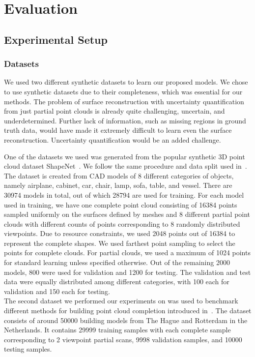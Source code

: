 \chapter{Evaluation}\label{ch:evaluation}



\section{Experimental Setup}


    \subsection{Datasets}
    We used two different synthetic datasets to learn our proposed models. We chose to use synthetic datasets due to their completeness, which was essential for our methods. The problem of surface reconstruction with uncertainty quantification from just partial point clouds is already quite challenging, uncertain, and underdetermined. Further lack of information, such as missing regions in ground truth data, would have made it extremely difficult to learn even the surface reconstruction. Uncertainty quantification would be an added challenge. 
    \newline
    
    One of the datasets we used was generated from the popular synthetic 3D point cloud dataset ShapeNet~\cite{ShapeNet}. We follow the same procedure and data split used in~\cite{PCN}. The dataset is created from CAD models of 8 different categories of objects, namely airplane, cabinet, car, chair, lamp, sofa, table, and vessel. There are 30974 models in total, out of which 28794 are used for training. For each model used in training, we have one complete point cloud consisting of 16384 points sampled uniformly on the surfaces defined by meshes and 8 different partial point clouds with different counts of points corresponding to 8 randomly distributed viewpoints. Due to resource constraints, we used 2048 points out of 16384 to represent the complete shapes. We used farthest point sampling to select the points for complete clouds. For partial clouds, we used a maximum of 1024 points for standard learning unless specified otherwise. Out of the remaining 2000 models, 800 were used for validation and 1200 for testing. The validation and test data were equally distributed among different categories, with 100 each for validation and 150 each for testing. 
    \\
    The second dataset we performed our experiments on was used to benchmark different methods for building point cloud completion introduced in~\cite{BuildingPCC}. The dataset consists of around 50000 building models from The Hague and Rotterdam in the Netherlands. It contains 29999 training samples with each complete sample corresponding to 2 viewpoint partial scans, 9998 validation samples, and 10000 testing samples. 


